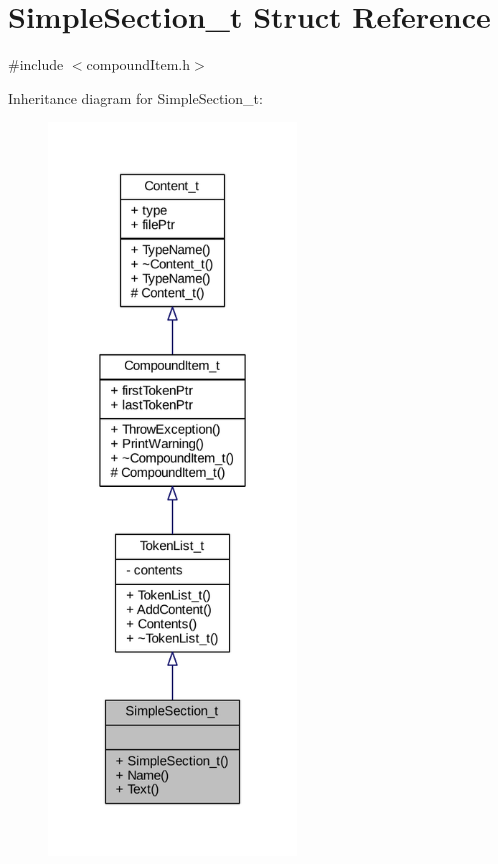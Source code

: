 \hypertarget{struct_simple_section__t}{}\section{Simple\+Section\+\_\+t Struct Reference}
\label{struct_simple_section__t}


{\ttfamily \#include $<$compound\+Item.\+h$>$}



Inheritance diagram for Simple\+Section\+\_\+t\+:
\nopagebreak
\begin{figure}[H]
\begin{center}
\leavevmode
\includegraphics[height=550pt]{struct_simple_section__t__inherit__graph}
\end{center}
\end{figure}


